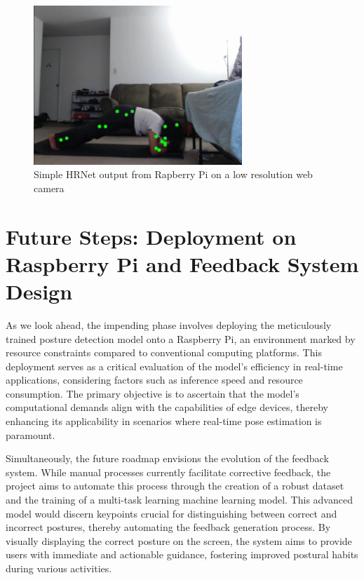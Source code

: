 \documentclass{article}
\begin{document}
\begin{figure}
  \centering
  \includegraphics[width=0.7\textwidth]{Raspberrypi_op.jpg}
  \caption{Simple HRNet output from Rapberry Pi on a low resolution web camera}
  \label{fig5}
\end{figure}

\section{Future Steps: Deployment on Raspberry Pi and Feedback System Design}
As we look ahead, the impending phase involves deploying the meticulously trained posture detection model onto a Raspberry Pi, an environment marked by resource constraints compared to conventional computing platforms. This deployment serves as a critical evaluation of the model's efficiency in real-time applications, considering factors such as inference speed and resource consumption. The primary objective is to ascertain that the model's computational demands align with the capabilities of edge devices, thereby enhancing its applicability in scenarios where real-time pose estimation is paramount.

Simultaneously, the future roadmap envisions the evolution of the feedback system. While manual processes currently facilitate corrective feedback, the project aims to automate this process through the creation of a robust dataset and the training of a multi-task learning machine learning model. This advanced model would discern keypoints crucial for distinguishing between correct and incorrect postures, thereby automating the feedback generation process. By visually displaying the correct posture on the screen, the system aims to provide users with immediate and actionable guidance, fostering improved postural habits during various activities.
\end{document}
